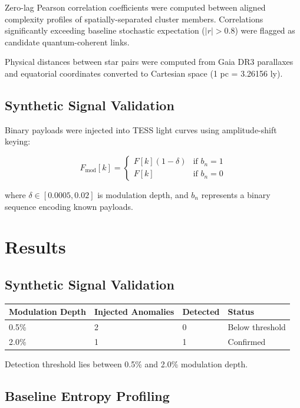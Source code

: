 \documentclass[twocolumn,10pt]{article}
\begin{document}
Zero-lag Pearson correlation coefficients were computed between aligned complexity profiles of spatially-separated cluster members. Correlations significantly exceeding baseline stochastic expectation ($|r| > 0.8$) were flagged as candidate quantum-coherent links.

Physical distances between star pairs were computed from Gaia DR3 parallaxes and equatorial coordinates converted to Cartesian space (1 pc = 3.26156 ly).

\subsection{Synthetic Signal Validation}

Binary payloads were injected into TESS light curves using amplitude-shift keying:

$$F_{\text{mod}}[k] = \begin{cases} F[k](1-\delta) & \text{if } b_n = 1 \\ F[k] & \text{if } b_n = 0 \end{cases}$$

where $\delta \in [0.0005, 0.02]$ is modulation depth, and $b_n$ represents a binary sequence encoding known payloads.

\section{Results}

\subsection{Synthetic Signal Validation}

\begin{center}
\begin{tabular}{llll}
\toprule
Modulation Depth & Injected Anomalies & Detected & Status \\
\midrule
0.5\% & 2 & 0 & Below threshold \\
2.0\% & 1 & 1 & Confirmed \\
\bottomrule
\end{tabular}
\end{center}

Detection threshold lies between 0.5\% and 2.0\% modulation depth.

\subsection{Baseline Entropy Profiling}
\end{document}
